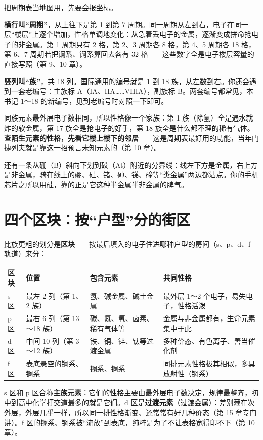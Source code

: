 把周期表当地图用，先要会报坐标。

\textbf{横行叫“周期”}，从上往下是第 1 到第 7 周期。同一周期从左到右，电子在同一层“楼层”上逐个增加，性格单调地变化：从急着丢电子的金属，逐渐变成拼命抢电子的非金属。第 1 周期只有 2 格，第 2、3 周期各 8 格，第 4、5 周期各 18 格，第 6、7 周期若把镧系、锕系算回去各有 32 格——这些数字全是电子楼层容量的直接写照（第 9、10 章）。

\textbf{竖列叫“族”}，共 18 列。国际通用的编号就是 1 到 18 族，从左数到右。你还会遇到一套老编号：主族标 A（IA、IIA……VIIIA），副族标 B。两套编号都常见，本书记 1～18 的新编号，见到老编号时对照一下即可。

同族元素最外层电子数相同，所以性格像一个家族：第 1 族（除氢）全是遇水就炸的软金属，第 17 族全是抢电子的好手，第 18 族全是什么都不理的稀有气体。\textbf{查陌生元素的性格，先看它楼上楼下的邻居}——这是周期表最好用的功能，当年门捷列夫就是靠这一招预言未知元素的（第 10 章）。

还有一条从硼（B）斜向下划到砹（At）附近的分界线：线左下方是金属，右上方是非金属，骑在线上的硼、硅、锗、砷、锑、碲等“类金属”两边都沾点。你的手机芯片之所以用硅，靠的正是它这种半金属半非金属的脾气。

\section{四个区块：按“户型”分的街区}

比族更粗的划分是\textbf{区块}——按最后填入的电子住进哪种户型的房间（s、p、d、f 轨道）来分：

\begin{table}[htbp]
\centering
\begin{tabular}{llll}
\toprule
区块 & 位置 & 包含元素 & 共同性格 \\
\midrule
s 区 & 最左 2 列（第 1、2 族） & 氢、碱金属、碱土金属 & 最外层 1～2 个电子，易失电子，性格活泼 \\
p 区 & 最右 6 列（第 13～18 族） & 碳、氮、氧、卤素、稀有气体等 & 金属与非金属都有，生命元素集中于此 \\
d 区 & 中间 10 列（第 3～12 族） & 铁、铜、锌、钛等过渡金属 & 多种价态、有色离子、善当催化剂 \\
f 区 & 表底悬空的镧系、锕系 & 镧系、锕系 & 同排元素性格极其相似，多具放射性（锕系） \\
\bottomrule
\end{tabular}
\end{table}

s 区和 p 区合称\textbf{主族元素}：它们的性格主要由最外层电子数决定，规律最整齐，初中到高中化学打交道最多的就是它们。d 区是\textbf{过渡元素}（过渡金属）：差别藏在次外层，外层几乎一样，所以同一排性格渐变、还常常有好几种价态（第 15 章专门讲）。f 区的镧系、锕系被“流放”到表底，纯粹是为了不让表格宽得印不下（第 10 章）。


